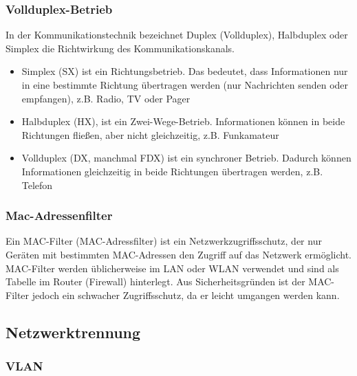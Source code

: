         \subsubsection{Vollduplex-Betrieb}

        In der Kommunikationstechnik bezeichnet Duplex (Vollduplex), Halbduplex oder Simplex die 
        Richtwirkung des Kommunikationskanals.
        \begin{itemize}
            \item Simplex (SX) ist ein Richtungsbetrieb. Das bedeutet, dass Informationen nur in eine bestimmte Richtung übertragen werden (nur Nachrichten senden oder empfangen), z.B. Radio, TV oder Pager
            \item Halbduplex (HX), ist ein Zwei-Wege-Betrieb. Informationen können in beide Richtungen fließen, aber nicht gleichzeitig, z.B. Funkamateur
            \item Vollduplex (DX, manchmal FDX) ist ein synchroner Betrieb. Dadurch können Informationen gleichzeitig in beide Richtungen übertragen werden, z.B. Telefon
        \end{itemize}

        \subsubsection{Mac-Adressenfilter}

        Ein MAC-Filter (MAC-Adressfilter) ist ein Netzwerkzugriffsschutz, 
        der nur Geräten mit bestimmten MAC-Adressen den Zugriff auf das Netzwerk 
        ermöglicht. MAC-Filter werden üblicherweise im LAN oder WLAN verwendet und 
        sind als Tabelle im Router (Firewall) hinterlegt. Aus Sicherheitsgründen ist 
        der MAC-Filter jedoch ein schwacher Zugriffsschutz, da er leicht umgangen werden kann.

    \subsection{Netzwerktrennung}

        \subsubsection{VLAN}

